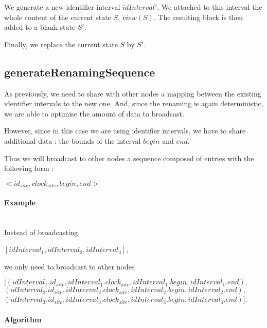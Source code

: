 \documentclass[a4paper]{article}
\begin{document}
We generate a new identifier interval $idInterval'$.
We attached to this interval the whole content of the current state $S$, $view(S)$.
The resulting block is then added to a blank state $S'$.

Finally, we replace the current state $S$ by $S'$.

\subsection{generateRenamingSequence}

As previously, we need to share with other nodes a mapping between the existing
identifier intervals to the new one. And, since the renaming is again deterministic,
we are able to optimise the amount of data to broadcast.

However, since in this case we are using identifier intervals, we have to share
additional data : the bounds of the interval $begin$ and $end$.

Thus we will broadcast to other nodes a sequence composed of entries with the following form :

\begin{center}
  $<id_{site}, clock_{site}, begin, end>$
\end{center}

\paragraph{Example}~\\

Instead of broadcasting
\begin{center}
  $[idInterval_1, idInterval_2, idInterval_3]$,
\end{center}
we only need to broadcast to other nodes
\begin{center}
  $[(idInterval_1.id_{site}, idInterval_1.clock_{site}, idInterval_1.begin, idInterval_1.end),$\\
  $(idInterval_2.id_{site}, idInterval_2.clock_{site}, idInterval_2.begin, idInterval_2.end),$\\
  $(idInterval_3.id_{site}, idInterval_3.clock_{site}, idInterval_3.begin, idInterval_3.end)]$.
\end{center}

\paragraph{Algorithm}~\\
\end{document}
